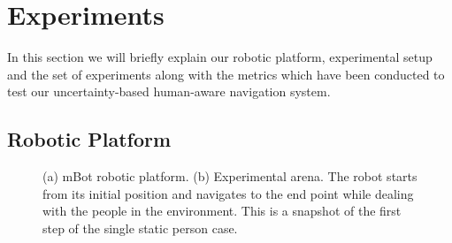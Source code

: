 \section{Experiments}
\label{sec:experimental_setup}
In this section we will briefly explain our robotic platform, experimental setup and the set of experiments along with the metrics which have been conducted to test our uncertainty-based human-aware navigation system.

\subsection{Robotic Platform}
\label{sec:robot}

\begin{figure}[t!]
\centering
{}%
\hspace{0.1cm}
%
\hspace{0.1cm}

\caption{(a) mBot robotic platform. (b) Experimental arena. The robot starts from its initial position and navigates to the end point while dealing with the people in the environment. This is a snapshot of the first step of the single static person case.}
\label{fig:setup}
\end{figure}





